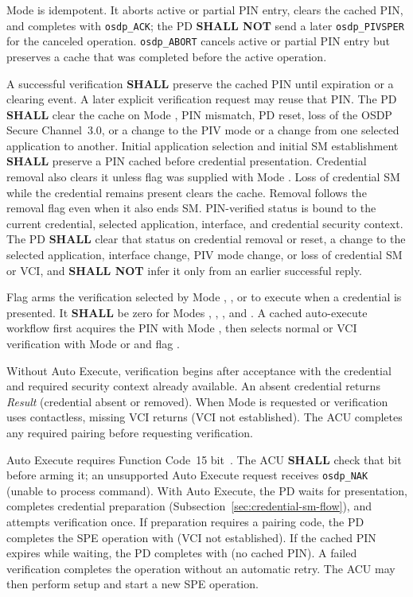 Mode  is idempotent. It aborts active or partial PIN entry, clears
the cached PIN, and completes with \texttt{osdp\_ACK}; the PD \textbf{SHALL
NOT} send a later \texttt{osdp\_PIVSPER} for the canceled operation.
\texttt{osdp\_ABORT} cancels active or partial PIN entry but preserves a cache
that was completed before the active operation.

A successful verification \textbf{SHALL} preserve the cached PIN until
expiration or a clearing event. A later explicit verification request may
reuse that PIN. The PD \textbf{SHALL} clear the cache on Mode ,
PIN mismatch, PD reset, loss of the OSDP Secure Channel~3.0, or a
change to the PIV mode or a change from one selected application to another.
Initial application selection and initial SM establishment \textbf{SHALL}
preserve a PIN cached before credential presentation. Credential removal also clears
it unless flag  was supplied with Mode . Loss of credential
SM while the credential remains present clears the cache. Removal follows the
removal flag even when it also ends SM. PIN-verified
status is bound to the current credential, selected application, interface,
and credential security context. The PD \textbf{SHALL} clear that status on
credential removal or reset, a change to the selected application, interface
change, PIV mode change, or loss of credential SM or VCI, and \textbf{SHALL NOT} infer it only
from an earlier successful reply.



Flag  arms the verification selected by Mode ,
, or  to execute when a credential is presented. It
\textbf{SHALL} be zero for Modes , , , and
. A cached auto-execute workflow first acquires the PIN with Mode
, then selects normal or VCI verification with Mode  or
 and flag .

Without Auto Execute, verification begins after acceptance with the credential
and required security context already available. An absent credential returns
\emph{Result}  (credential absent or removed). When Mode 
is requested or verification uses contactless, missing VCI returns
 (VCI not established). The ACU completes any required pairing before
requesting verification.

Auto Execute requires Function Code~15 bit~. The ACU \textbf{SHALL}
check that bit before arming it; an unsupported Auto Execute request receives
\texttt{osdp\_NAK}  (unable to process command).
With Auto Execute, the PD waits for presentation, completes credential preparation
(Subsection~\ref{sec:credential-sm-flow}), and attempts verification once. If
preparation requires a pairing code, the PD completes the SPE operation with
 (VCI not established). If the cached PIN expires while waiting,
the PD completes with  (no cached PIN). A failed verification completes
the operation without an automatic retry. The ACU may then perform setup and
start a new SPE operation.


